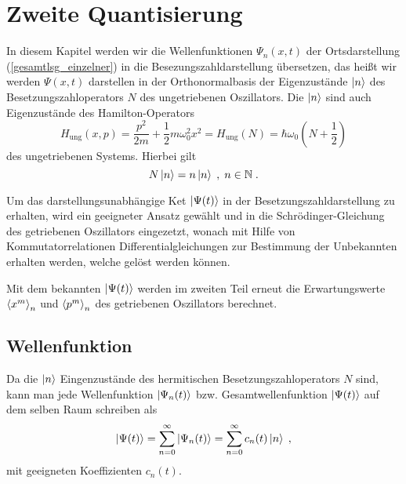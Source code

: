 \chapter{Zweite Quantisierung}
\label{5}
In diesem Kapitel werden wir die Wellenfunktionen $\Psi_n(x,t)$ der Ortsdarstellung (\ref{gesamtlsg_einzelner}) in die Besezungszahldarstellung übersetzen, das heißt wir werden $\Psi(x,t)$ darstellen in der Orthonormalbasis der Eigenzustände $\ket{n}$ des Besetzungszahloperators $N$ des ungetriebenen Oszillators.
Die $\ket{n}$ sind auch Eigenzustände des Hamilton-Operators
\begin{equation}
   H_\text{ung}(x,p) = \frac{ p^2}{2m} + \frac 1 2 m\omega_0^2 x^2 = H_{\text{ung}}(N)= \hbar\omega_0\left(N+\frac 1 2\right)
\end{equation}
des ungetriebenen Systems.
Hierbei gilt
\begin{equation}
   N \ket{n} = n \ket{n} \;,\; n\in \mathbb{N} \;.
\end{equation}
\iffalse
\begin{equation}
  H=\frac{\hat p^2}{2m} + \frac 1 2 m\omega_0^2\hat x^2 = \hbar\eft(\hat n+\frac 1 2\right)
\end{equation}
\fi
Um das darstellungsunabhängige Ket $\ket{\Psi(t)}$ in der Besetzungszahldarstellung zu erhalten, wird ein geeigneter Ansatz gewählt und in die Schrödinger-Gleichung des getriebenen Oszillators eingezetzt, wonach mit Hilfe von Kommutatorrelationen Differentialgleichungen zur Bestimmung der Unbekannten erhalten werden, welche gelöst werden können.

Mit dem bekannten $\ket{\Psi(t)}$ werden im zweiten Teil erneut die Erwartungswerte $\braket{x^m}_n$ und $\braket{p^m}_n$ des getriebenen Oszillators berechnet.


\section{Wellenfunktion}
  Da die $\ket{n}$ Eingenzustände des hermitischen Besetzungszahloperators $N$ sind, kann man jede Wellenfunktion $\ket{\Psi_n(t)}$ bzw. Gesamtwellenfunktion $\ket{\Psi(t)}$ auf dem selben Raum schreiben als
  \begin{equation}
    \ket{\Psi(t)}=\sum_{n=0}^{\infty}\ket{\Psi_n(t)}=\sum_{n=0}^{\infty}c_n(t)\ket{n} \;,
  \end{equation}
  mit geeigneten Koeffizienten $c_n(t)$.


